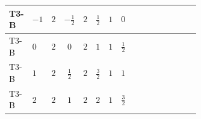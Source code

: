 \documentclass[8pt]{article}
\begin{document}
\begin{landscape}
\begin{longtable}{@{}llcccccc >{\raggedright\arraybackslash}p{0.21\linewidth} >{\raggedright\arraybackslash}p{0.21\linewidth} >{\raggedright\arraybackslash}p{0.21\linewidth}@{}}
\midrule
T3-B & $-1$ & $2$ & $-\frac{1}{2}$ & $2$ & $\frac{1}{2}$ & $1$ & $0$ & \scriptsize\adjustbox{max width=\linewidth}{$\begin{gathered} - 3 C_{5} g_{2}^{2}\end{gathered}$} & \scriptsize\adjustbox{max width=\linewidth}{$\begin{gathered} 2 C_{5} \lambda_1\end{gathered}$} & \scriptsize\adjustbox{max width=\linewidth}{$\begin{gathered} - C_{5} Y_e Y_e^\dagger\end{gathered}$} \\
\midrule
T3-B & $0$ & $2$ & $0$ & $2$ & $1$ & $1$ & $\frac{1}{2}$ & \scriptsize\adjustbox{max width=\linewidth}{$\begin{gathered} - 3 C_{5} g_{2}^{2}\end{gathered}$} & \scriptsize\adjustbox{max width=\linewidth}{$\begin{gathered} 2 C_{5} \lambda_1\end{gathered}$} & \scriptsize\adjustbox{max width=\linewidth}{$\begin{gathered} - C_{5} Y_e Y_e^\dagger\end{gathered}$} \\
\midrule
T3-B & $1$ & $2$ & $\frac{1}{2}$ & $2$ & $\frac{3}{2}$ & $1$ & $1$ & \scriptsize\adjustbox{max width=\linewidth}{$\begin{gathered} - 3 C_{5} g_{2}^{2}\end{gathered}$} & \scriptsize\adjustbox{max width=\linewidth}{$\begin{gathered} 2 C_{5} \lambda_1\end{gathered}$} & \scriptsize\adjustbox{max width=\linewidth}{$\begin{gathered} - C_{5} Y_e Y_e^\dagger\end{gathered}$} \\
\midrule
T3-B & $2$ & $2$ & $1$ & $2$ & $2$ & $1$ & $\frac{3}{2}$ & \scriptsize\adjustbox{max width=\linewidth}{$\begin{gathered} - 3 C_{5} g_{2}^{2}\end{gathered}$} & \scriptsize\adjustbox{max width=\linewidth}{$\begin{gathered} 2 C_{5} \lambda_1\end{gathered}$} & \scriptsize\adjustbox{max width=\linewidth}{$\begin{gathered} - C_{5} Y_e Y_e^\dagger\end{gathered}$} \\

\end{longtable}
\end{landscape}
\end{document}
